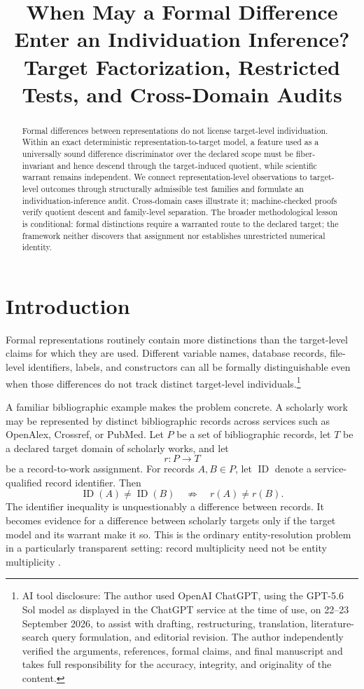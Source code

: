 \documentclass[12pt]{article}
\title{When May a Formal Difference Enter an Individuation Inference?\\
\large Target Factorization, Restricted Tests, and Cross-Domain Audits}
\author{}
\date{}
\begin{document}
\raggedright
\maketitle

\begin{abstract}

Formal differences between representations do not license target-level individuation. Within an exact deterministic representation-to-target model, a feature used as a universally sound difference discriminator over the declared scope must be fiber-invariant and hence descend through the target-induced quotient, while scientific warrant remains independent. We connect representation-level observations to target-level outcomes through structurally admissible test families and formulate an individuation-inference audit. Cross-domain cases illustrate it; machine-checked proofs verify quotient descent and family-level separation. The broader methodological lesson is conditional: formal distinctions require a warranted route to the declared target; the framework neither discovers that assignment nor establishes unrestricted numerical identity.

\end{abstract}
\section{Introduction}

Formal representations routinely contain more distinctions than the target-level claims for which they are used. Different variable names, database records, file-level identifiers, labels, and constructors can all be formally distinguishable even when those differences do not track distinct target-level individuals.\footnote{AI tool disclosure: The author used OpenAI ChatGPT, using the GPT-5.6 Sol model as displayed in the ChatGPT service at the time of use, on 22--23 September 2026, to assist with drafting, restructuring, translation, literature-search query formulation, and editorial revision. The author independently verified the arguments, references, formal claims, and final manuscript and takes full responsibility for the accuracy, integrity, and originality of the content.}

A familiar bibliographic example makes the problem concrete. A scholarly work may be represented by distinct bibliographic records across services such as OpenAlex, Crossref, or PubMed. Let \(P\) be a set of bibliographic records, let \(T\) be a declared target domain of scholarly works, and let
\[
r:P\to T
\]
be a record-to-work assignment. For records \(A,B\in P\), let \(\operatorname{ID}\) denote a service-qualified record identifier. Then
\[
\operatorname{ID}(A)\neq\operatorname{ID}(B)
\quad\not\Rightarrow\quad
r(A)\neq r(B).
\]
The identifier inequality is unquestionably a difference between records. It becomes evidence for a difference between scholarly targets only if the target model and its warrant make it so. This is the ordinary entity-resolution problem in a particularly transparent setting: record multiplicity need not be entity multiplicity \citep{AleshinGuendelSteorts2024EntityResolution}.
\end{document}
